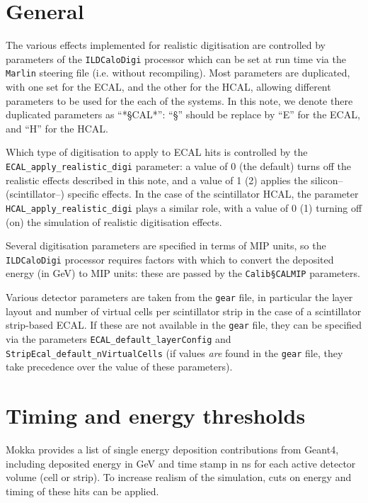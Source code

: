 \documentclass[12pt]{article} %
\begin{document}
\section{General}

The various effects implemented for realistic digitisation are controlled by parameters of the {\tt ILDCaloDigi}
processor which can be set at run time via the {\tt Marlin} steering file (i.e. without recompiling).
Most parameters are duplicated, with one set for the ECAL, and the other for the HCAL, allowing different
parameters to be used for the each of the systems. In this note, we denote there duplicated parameters as ``*\S CAL*'':
``\S'' should be replace by ``E'' for the ECAL, and ``H'' for the HCAL.

Which type of digitisation to apply to ECAL hits is controlled by the {\tt ECAL\_apply\_realistic\_digi} parameter: a value of
0 (the default) turns off the realistic effects described in this note, and a value of 1 (2) applies the silicon--
(scintillator--) specific effects. 
In the case of the scintillator HCAL, the parameter {\tt HCAL\_apply\_realistic\_digi}
plays a similar role, with a value of 0 (1) turning off (on) the simulation of realistic digitisation effects.

Several digitisation parameters are specified in terms of MIP units, so the {\tt ILDCaloDigi} processor requires 
factors with which to convert the deposited energy (in GeV) to MIP units: these are passed by the {\tt Calib\S CALMIP} parameters.

Various detector parameters are taken from the {\tt gear} file, in particular the layer layout and number of virtual 
cells per scintillator strip in the case of a scintillator strip-based ECAL. 
If these are not available in the {\tt gear} file, they can be specified via the
parameters {\tt ECAL\_default\_layerConfig} and {\tt StripEcal\_default\_nVirtualCells} (if values {\em are} found in the 
{\tt gear} file, they take precedence over the value of these parameters).

\section{Timing and energy thresholds}
Mokka provides a list of single energy deposition contributions from Geant4, including deposited energy in GeV and time stamp in ns for each active detector volume (cell or strip). To increase realism of the simulation, cuts on energy and timing of these hits can be applied.
\end{document}
